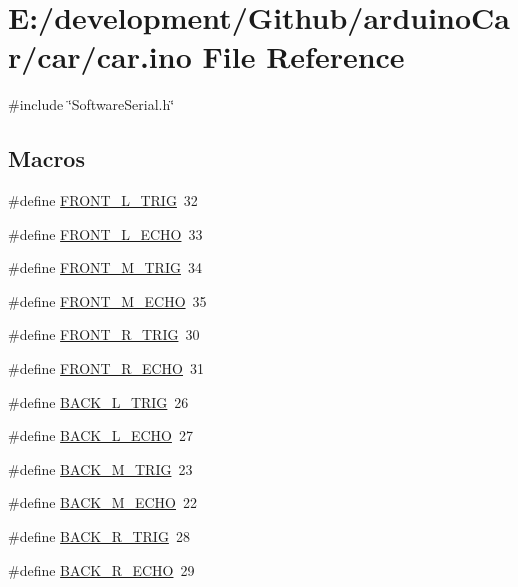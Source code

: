 \hypertarget{car_8ino}{}\section{E\+:/development/\+Github/arduino\+Car/car/car.ino File Reference}
\label{car_8ino}
{\ttfamily \#include \char`\"{}Software\+Serial.\+h\char`\"{}}\newline
\subsection*{Macros}
\begin{DoxyCompactItemize}
\item 
\#define \hyperlink{car_8ino_a338e185f573d6757f7924bc5b599466b}{F\+R\+O\+N\+T\+\_\+\+L\+\_\+\+T\+R\+IG}~32
\item 
\#define \hyperlink{car_8ino_a88d5c939e1bd2fdd56ff64aefa21359e}{F\+R\+O\+N\+T\+\_\+\+L\+\_\+\+E\+C\+HO}~33
\item 
\#define \hyperlink{car_8ino_a964db28e3b1061f3f048c2798cb62765}{F\+R\+O\+N\+T\+\_\+\+M\+\_\+\+T\+R\+IG}~34
\item 
\#define \hyperlink{car_8ino_a27970d12cc04360f3b07ca8fcfb7a2b9}{F\+R\+O\+N\+T\+\_\+\+M\+\_\+\+E\+C\+HO}~35
\item 
\#define \hyperlink{car_8ino_acbbe325ef617580d92b0e4e7fde4c56d}{F\+R\+O\+N\+T\+\_\+\+R\+\_\+\+T\+R\+IG}~30
\item 
\#define \hyperlink{car_8ino_a9b392165325fed7e3198fcfdd753747a}{F\+R\+O\+N\+T\+\_\+\+R\+\_\+\+E\+C\+HO}~31
\item 
\#define \hyperlink{car_8ino_a8d641702e3e9f91eb4c7828b7e87fe5a}{B\+A\+C\+K\+\_\+\+L\+\_\+\+T\+R\+IG}~26
\item 
\#define \hyperlink{car_8ino_ae702c7c201f7502d232dca39b5de9fcf}{B\+A\+C\+K\+\_\+\+L\+\_\+\+E\+C\+HO}~27
\item 
\#define \hyperlink{car_8ino_a283a085a4ca45da5313fb015386f1ae5}{B\+A\+C\+K\+\_\+\+M\+\_\+\+T\+R\+IG}~23
\item 
\#define \hyperlink{car_8ino_a5f6c39f0c693daba75edd3967f8f4453}{B\+A\+C\+K\+\_\+\+M\+\_\+\+E\+C\+HO}~22
\item 
\#define \hyperlink{car_8ino_a7c460aada4d1c1ddbcf9c366f2236ebb}{B\+A\+C\+K\+\_\+\+R\+\_\+\+T\+R\+IG}~28
\item 
\#define \hyperlink{car_8ino_a5d8f4fd2fefb0c3f623ae5c61e71574a}{B\+A\+C\+K\+\_\+\+R\+\_\+\+E\+C\+HO}~29
\item 

\end{DoxyCompactItemize}
